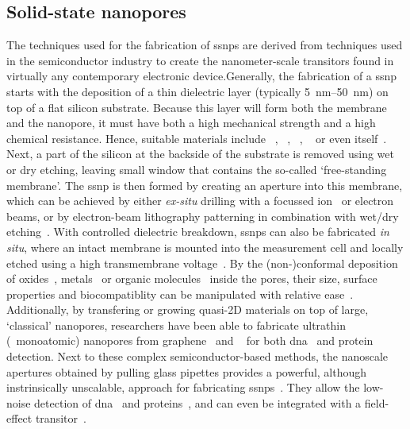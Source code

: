 \subsection{Solid-state nanopores}
%

The techniques used for the fabrication of \glspl{ssnp} are derived from techniques used in the semiconductor
industry to create the nanometer-scale transitors found in virtually any contemporary electronic
device.Generally, the fabrication of a \gls{ssnp} starts with the deposition of a thin dielectric layer
(typically \SIrange{5}{50}{\nm}) on top of a flat silicon substrate. Because this layer will form both the
membrane and the nanopore, it must have both a high mechanical strength and a high chemical resistance. Hence,
suitable materials include ~\cite{Li-2001,Storm-2003}, ~\cite{Storm-2005},
~\cite{Venkatesan-2009}, ~\cite{Larkin-2013} or even 
itself~\cite{Malachowski-2013}. Next, a part of the silicon at the backside of the substrate is removed using
wet or dry etching, leaving small window that contains the so-called `free-standing membrane'. The \gls{ssnp}
is then formed by creating an aperture into this membrane, which can be achieved by either \textit{ex-situ}
drilling with a focussed ion~\cite{Li-2001} or electron~\cite{Storm-2003} beams, or by electron-beam
lithography patterning in combination with wet/dry etching~\cite{Nam-2009}. With controlled dielectric
breakdown, \glspl{ssnp} can also be fabricated \textit{in situ}, where an intact membrane is mounted into the
measurement cell and locally etched using a high transmembrane voltage~\cite{Kwok-2014}. By the
(non-)conformal deposition of oxides~\cite{Chen-2004}, metals~\cite{Li-2013d,Auger-2014,Spitzberg-2019} or
organic molecules~\cite{Wanunu-2007,Yusko-2011,Wei-2012,Rotem-2012} inside the pores, their size, surface
properties and biocompatiblity can be manipulated with relative ease~\cite{Eggenberger-2019}. Additionally, by
transfering or growing quasi-2D materials on top of large, `classical' nanopores, researchers have been able
to fabricate ultrathin (\ie~monoatomic) nanopores from graphene~\cite{Fischbein-2008} and
~\cite{Feng-2015b} for both \gls{dna}~\cite{Feng-2015,Merchant-2010,Song-2011} and
protein~\cite{Shan-2013} detection. Next to these complex semiconductor-based methods, the nanoscale apertures
obtained by pulling glass pipettes provides a powerful, although instrinsically unscalable, approach for
fabricating \glspl{ssnp}~\cite{Wang-2006}. They allow the low-noise detection of
\gls{dna}~\cite{Steinbock-2013} and proteins~\cite{Li-2013B}, and can even be integrated with a field-effect
transitor~\cite{Ren-2020}.


